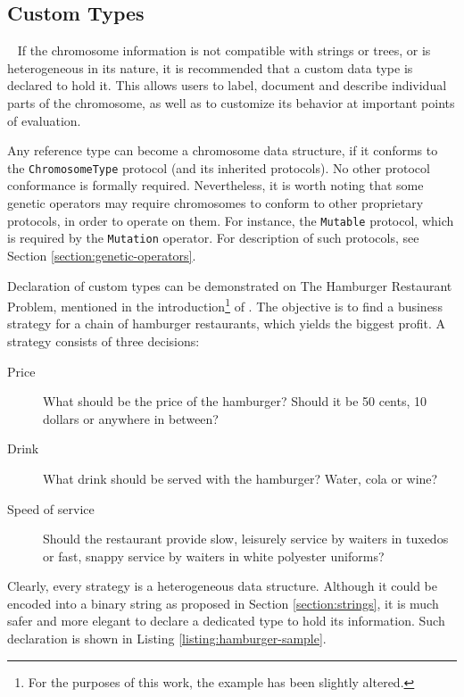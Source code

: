 \subsection{Custom Types}~\label{section:custom-types}
If the chromosome information is not compatible with strings or trees, or is heterogeneous in its nature, it is recommended that a custom data type is declared to hold it. This allows users to label, document and describe individual parts of the chromosome, as well as to customize its behavior at important points of evaluation.

Any reference type can become a chromosome data structure, if it conforms to the \texttt{ChromosomeType} protocol (and its inherited protocols). No other protocol conformance is formally required. Nevertheless, it is worth noting that some genetic operators may require chromosomes to conform to other proprietary protocols, in order to operate on them. For instance, the \texttt{Mutable} protocol, which is required by the \texttt{Mutation} operator. For description of such protocols, see Section \ref{section:genetic-operators}.

Declaration of custom types can be demonstrated on The Hamburger Restaurant Problem, mentioned in the introduction\footnote{For the purposes of this work, the example has been slightly altered.} of \cite{Koza1992}. The objective is to find a business strategy for a chain of hamburger restaurants, which yields the biggest profit. A strategy consists of three decisions:
~
\begin{description}
	\item[Price]
	What should be the price of the hamburger? Should it be 50 cents, 10 dollars or anywhere in between?

	\item[Drink]
	What drink should be served with the hamburger? Water, cola or wine?

	\item[Speed of service]
	Should the restaurant provide slow, leisurely service by waiters in tuxedos or fast, snappy service by waiters in white polyester uniforms?
\end{description}

Clearly, every strategy is a heterogeneous data structure. Although it could be encoded into a binary string as proposed in Section \ref{section:strings}, it is much safer and more elegant to declare a dedicated type to hold its information. Such declaration is shown in Listing \ref{listing:hamburger-sample}.

